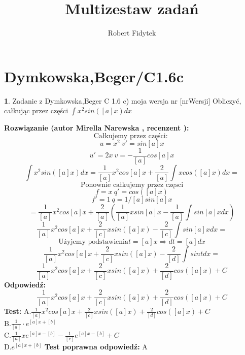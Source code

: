 \documentclass[12pt, a4paper]{article}
\title{Multizestaw zadań}
\author{Robert Fidytek}
\date{}
\theoremstyle{definition} %
\newtheorem{zad}{}
\newcommand{\kategoria}[1]{\section{#1}} %
\newcommand{\zadStart}[1]{\begin{zad}#1\newline} %
\newcommand{\zadStop}{\end{zad}}   %
\newcommand{\rozwStart}[2]{\noindent \textbf{Rozwiązanie (autor #1 , recenzent #2): }\newline} %
\newcommand{\odpStart}{\noindent \textbf{Odpowiedź:}\newline}    %
\newcommand{\odpStop}{\newline}                                             %
\newcommand{\testStart}{\noindent \textbf{Test:}\newline} %
\newcommand{\testStop}{\newline} %
\newcommand{\kluczStart}{\noindent \textbf{Test poprawna odpowiedź:}\newline} %
\newcommand{\kluczStop}{\newline} %
\begin{document}
\maketitle



\kategoria{Dymkowska,Beger/C1.6c}
\zadStart{Zadanie z Dymkowska,Beger C 1.6 c) moja wersja nr [nrWersji]}
Obliczyć, całkując przez części $\displaystyle \int x^2sin([a]x)dx$
\zadStop
\rozwStart{Mirella Narewska}{}
$$\text{Całkujemy przez części: }$$
$$u=x^2 \ v'=sin[a]x$$
$$u'=2x \ v=-\frac{1}{[a]}cos[a]x$$
$$\displaystyle \int x^2sin([a]x)dx=\displaystyle \frac{1}{[a]}x^2cos[a]x+ \frac{2}{[a]}\int xcos([a]x)dx=$$
$$\text{Ponownie całkujemy przez częsci}$$
$$ f=x \ q'=cos([a]x)$$
$$f'=1 \ q=1/[a]sin[a]x$$
$$=\displaystyle \frac{1}{[a]}x^2cos[a]x+ \frac{2}{[a]}\left( \frac{1}{[a]}xsin[a]x-\frac{1}{[a]} \int sin[a]x dx\right)$$
$$\displaystyle \frac{1}{[a]}x^2cos[a]x+\frac{2}{[c]}xsin([a]x)-\frac{2}{[c]} \int sin[a]xdx=$$
$$\text{Użyjemy podstawienia} t=[a]x \Rightarrow dt=[a]dx$$
$$\displaystyle \frac{1}{[a]}x^2cos[a]x+\frac{2}{[c]}xsin([a]x)-\frac{2}{[d]} \int sint dx=$$
$$\displaystyle \frac{1}{[a]}x^2cos[a]x+\frac{2}{[c]}xsin([a]x)+\frac{2}{[d]}cos([a]x) +C$$
\odpStart
$$\frac{1}{[a]}x^2cos[a]x+\frac{2}{[c]}xsin([a]x)+\frac{2}{[d]}cos([a]x) + C$$
\odpStop
\testStart
A.$\frac{1}{[a]}x^2cos[a]x+\frac{2}{[c]}xsin([a]x)+\frac{2}{[d]}cos([a]x) + C$
\\
B.$\frac{1}{[a]}\cdot e^{[a]x+[b]}$
\\
C.$\frac{1}{[a]}xe^{[a]x-[b]} -\frac{1}{[c]}e^{[a]x-[b]} + C$
\\
D.$e^{[a]x+[b]}$
\testStop
\kluczStart
A
\kluczStop
\end{document}
